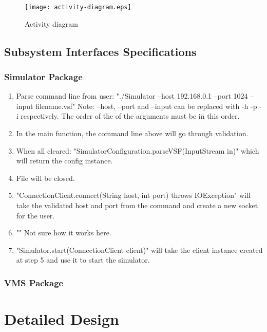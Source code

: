 \documentclass{article}
\begin{document}
\begin{figure}[h]	
\caption{Activity diagram}
\texttt{[image: activity-diagram.eps]}
\end{figure}

\subsection{Subsystem Interfaces Specifications}

\subsubsection{Simulator Package}

\begin{enumerate}
  \item Parse command line from user: 
		\newline "./Simulator --host 192.168.0.1 --port 1024 --input filename.vsf"
		\newline Note: --host, --port and --input can be replaced with -h -p -i respectively.
		\newline The order of the of the arguments must be in this order.
  \item In the main function, the command line above will go through validation.
  \item When all cleared: "SimulatorConfiguration.parseVSF(InputStream in)"
		\newline which will return the config instance.
  \item File will be closed.
	\item "ConnectionClient.connect(String host, int port) throws IOException" will take the validated host and port from the command and create a new socket for the user.
	\item "" Not sure how it works here.
	\item "Simulator.start(ConnectionClient client)" will take the client instance created at step 5 and use it to start the simulator.	
\end{enumerate}

\subsubsection{VMS Package}

\section{Detailed Design} %
\end{document}
